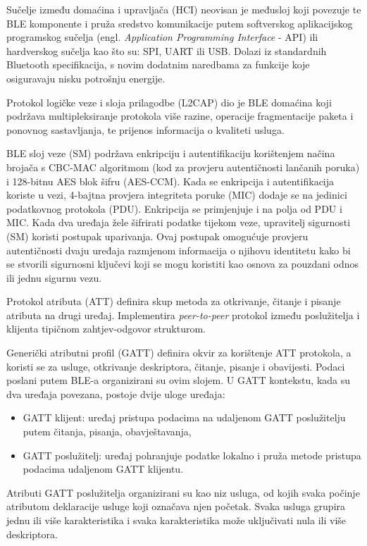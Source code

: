 Sučelje između domaćina i upravljača (HCI) neovisan je međusloj koji povezuje te BLE komponente i pruža sredstvo komunikacije putem softverskog aplikacijskog programskog sučelja (engl. \textit{Application Programming Interface} - API) ili hardverskog sučelja kao što su: SPI, UART ili USB. Dolazi iz standardnih Bluetooth specifikacija, s novim dodatnim naredbama za funkcije koje osiguravaju nisku potrošnju energije.

Protokol logičke veze i sloja prilagodbe (L2CAP) dio je BLE domaćina koji podržava multipleksiranje protokola više razine, operacije fragmentacije paketa i ponovnog sastavljanja, te prijenos informacija o kvaliteti usluga.

BLE sloj veze (SM) podržava enkripciju i autentifikaciju korištenjem načina brojača s CBC-MAC algoritmom (kod za provjeru autentičnosti lančanih poruka) i 128-bitnu AES blok šifru (AES-CCM). Kada se enkripcija i autentifikacija koriste u vezi, 4-bajtna provjera integriteta poruke (MIC) dodaje se na jedinici podatkovnog protokola (PDU). Enkripcija se primjenjuje i na polja od PDU i MIC. Kada dva uređaja žele šifrirati podatke tijekom veze, upravitelj sigurnosti (SM) koristi postupak uparivanja. Ovaj postupak omogućuje provjeru autentičnosti dvaju uređaja razmjenom informacija o njihovu identitetu kako bi se stvorili sigurnosni ključevi koji se mogu koristiti kao osnova za pouzdani odnos ili jednu sigurnu vezu. 

Protokol atributa (ATT) definira skup metoda za otkrivanje, čitanje i pisanje atributa na drugi uređaj. Implementira \textit{peer-to-peer} protokol između poslužitelja i klijenta tipičnom zahtjev-odgovor strukturom. 

Generički atributni profil (GATT) definira okvir za korištenje ATT protokola, a koristi se za usluge, otkrivanje deskriptora, čitanje, pisanje i obavijesti. Podaci poslani putem BLE-a organizirani su ovim slojem.
U GATT kontekstu, kada su dva uređaja povezana, postoje dvije uloge uređaja:
\begin{itemize}
	\item GATT klijent: uređaj pristupa podacima na udaljenom GATT poslužitelju putem čitanja, pisanja, obavještavanja,
	\item  GATT poslužitelj: uređaj pohranjuje podatke lokalno i pruža metode pristupa podacima udaljenom GATT klijentu.
\end{itemize}

Atributi GATT poslužitelja organizirani su kao niz usluga, od kojih svaka počinje atributom deklaracije usluge koji označava njen početak. Svaka usluga grupira jednu ili više karakteristika i svaka karakteristika može uključivati nula ili više deskriptora.

